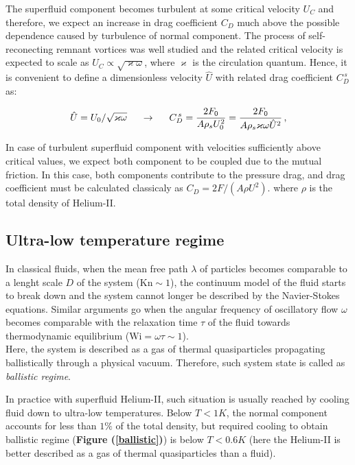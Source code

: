 The superfluid component becomes turbulent at some critical velocity $U_C$ and therefore, we expect an increase in drag coefficient $C_D$ much above the possible dependence caused by turbulence of normal component. The process of self-reconecting remnant vortices was well studied \cite{universal_scaling} and the related critical velocity is expected to scale as $U_C \propto \sqrt{\varkappa \omega}$, where $\varkappa$ is the circulation quantum. Hence, it is convenient to define a dimensionless velocity $\hat{U}$ with related drag coefficient $C_D^{\,s}$ as:

\begin{equation}
\hat{U} = U_0 / \sqrt{\varkappa \omega}
\hspace{5mm}
\rightarrow
\hspace{5mm}
C_D^{\,s} = \frac{2 F_0}{A \rho_s U_0^2} = \frac{2 F_0}{A \rho_s \varkappa \omega \hat{U}^2}\,,
\label{drag_super}
\end{equation}

In case of turbulent superfluid component with velocities sufficiently above critical values, we expect both component to be coupled due to the mutual friction. In this case, both components contribute to the pressure drag, and drag coefficient must be calculated classicaly as $C_D = 2F / (A\rho U^2)$. where $\rho$ is the total density of Helium-II.

\newpage

\subsection*{Ultra-low temperature regime}

In classical fluids, when the mean free path $\lambda$ of particles becomes comparable to a lenght scale $D$ of the system ($\text{Kn} \sim 1$), the continuum model of the fluid starts to break down and the system cannot longer be described by the Navier-Stokes equations. Similar arguments go when the angular frequency of oscillatory flow $\omega$ becomes comparable with the relaxation time $\tau$ of the fluid towards thermodynamic equilibrium ($\text{Wi} = \omega \tau \sim 1$).\\
Here, the system is described as a gas of thermal quasiparticles propagating
ballistically through a physical vacuum. Therefore, such system state is called as \textit{ballistic regime}.

In practice with superfluid Helium-II, such situation is usually reached by cooling fluid  down to ultra-low temperatures. Below $T < 1\unit{K}$, the normal component accounts for less than $1\%$ of the total density, but required cooling to obtain ballistic regime (\textbf{Figure (\ref{ballistic})}) is below $T < 0.6\unit{K}$ (here the Helium-II is better described as a gas of thermal quasiparticles than a fluid).

